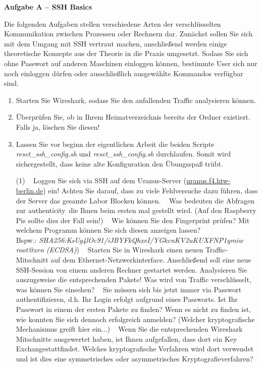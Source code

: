 \documentclass[paper=a4,fontsize=11pt]{scrartcl}%
\numberwithin{equation}{section}
\begin{document}
\begin{center}\Large{\textbf{Aufgabe A -- SSH Basics}}\end{center}\vskip0.25in
Die folgenden Aufgaben stellen verschiedene Arten der verschlüsselten Kommunikation zwischen Prozessen oder Rechnern dar. Zunächst sollen Sie sich mit dem Umgang mit SSH vertraut machen, anschließend werden einige theoretische Konzepte aus der Theorie in die Praxis umgesetzt. Sodass Sie sich ohne Passwort auf anderen Maschinen einloggen können, bestimmte User sich nur noch einloggen dürfen oder ausschließlich ausgewählte Kommandos verfügbar sind. 
\begin{enumerate}
\item Starten Sie Wireshark, sodass Sie den anfallenden Traffic analysieren können.
\item Überprüfen Sie, ob in Ihrem Heimatverzeichnis bereits der Ordner  existiert. Falls ja, löschen Sie diesen!
\item Lassen Sie vor beginn der eigentlichen Arbeit die beiden Scripte \emph{reset\_ssh\_config.sh} und \emph{reset\_ssh\_config.sh} durchlaufen. Somit wird sichergestellt, dass keine alte Konfiguration den Übungsspaß trübt. 
\begin{tasks}(1)
	\task~ Loggen Sie sich via SSH auf dem Uranus-Server (\url{uranus.f4.htw-berlin.de}) ein! Achten Sie darauf, dass zu viele Fehlversuche dazu führen, dass der Server das gesamte Labor Blocken können.
	\task~ Was bedeuten die Abfragen zur \glqq authenticity\grqq\ die Ihnen beim ersten mal gestellt wird. (Auf den Raspberry Pis sollte dies der Fall sein!)
	\task~ Wie können Sie den Fingerprint prüfen? Mit welchem Programm können Sie sich diesen anzeigen lassen?\\
	Bspw.: \small{ \emph{SHA256:KsUg4lOc91/iJBYFkQhxeI/YGkcnKV2uKUXFNP1ymiw root@xen (ECDSA)}})
	\task~ Starten Sie in Wireshark einen neuen Traffic-Mitschnitt auf dem Ethernet-Netzwerkinterface. Anschließend soll eine neue SSH-Session von einem anderen Rechner gestartet werden. Analysieren Sie auszugsweise die entsprechenden Pakete! Was wird von Traffic verschlüsselt, was können Sie einsehen? 
	\task~ Sie müssen sich bis jetzt immer via Passwort authentifizieren, d.h. Ihr Login erfolgt aufgrund eines Passworts. Ist Ihr Passwort in einem der ersten Pakete zu finden? Wenn es nicht zu finden ist, wie konnten Sie sich dennoch erfolgreich anmelden? (Welcher kryptografische Mechanismus greift hier ein...)
	\task~ Wenn Sie die entsprechenden Wireshark Mitschnitte ausgewertet haben, ist Ihnen aufgefallen, dass dort ein \glqq Key Exchange\grqq stattfindet. Welches kryptografische Verfahren wird dort verwendet und ist dies eine symmetrisches oder asymmetrisches Kryptografieverfahren?

\end{tasks}
\end{enumerate}
\end{document}
